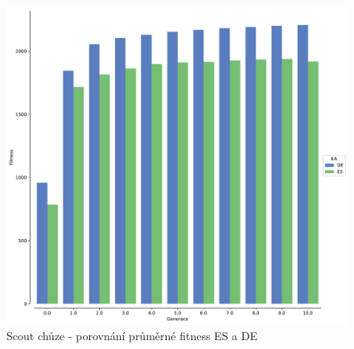 	\begin{figure}[t]\centering
		\includegraphics[width=\columnwidth]{../img/WoodMap/DEvsES/WCuttorWalkMem}
		\caption{ Scout chůze - porovnání průměrné fitness ES a DE}
		\label{obr04:WalkESvsDE}
	\end{figure}
